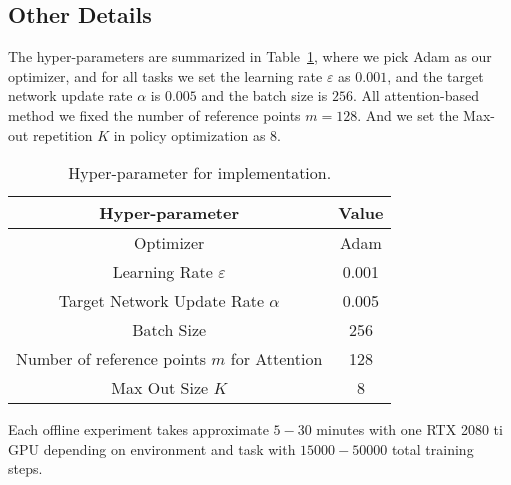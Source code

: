 \subsection{Other Details}

The hyper-parameters are summarized in Table~\ref{tab:hyper_parameter},
where we pick Adam as our optimizer, and for all tasks we set the learning rate $\varepsilon$ as $0.001$, and the target network update rate $\alpha$ is $0.005$ and the batch size is $256$.
All attention-based method we fixed the number of reference points $m = 128$.
And we set the Max-out repetition $K$ in policy optimization as $8$.
\begin{table}[h]
    \centering
    \begin{tabular}{cc}
    \hline
        Hyper-parameter & Value \\
    \hline
        Optimizer & Adam \\
        Learning Rate $\varepsilon$ & 0.001\\
        Target Network Update Rate $\alpha$ & 0.005 \\
        Batch Size & 256  \\
        Number of reference points $m$ for Attention & 128 \\
        Max Out Size $K$ & 8\\
    \hline
    \end{tabular}
    \caption{Hyper-parameter for implementation.}
    \label{tab:hyper_parameter}
\end{table}

Each offline experiment takes approximate $5-30$ minutes with one RTX 2080 ti GPU depending on environment and task with $15000 - 50000$ total training steps.

